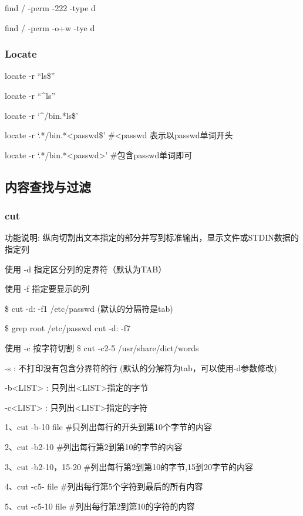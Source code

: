 \documentclass[letterpaper,10pt]{sphinxmanual}
\begin{document}
find / -perm -222 -type d

find / -perm -o+w -tye d


\subsubsection{Locate}
\label{Linux_find/file:locate}
locate -r ``ls\$''

locate -r ``\textasciicircum{}ls''

locate -r `\textasciicircum{}/bin.*ls\$'

locate -r `.*/bin.*\textless{}passwd\$'  \#\textless{}passwd 表示以passwd单词开头

locate -r `.*/bin.*\textless{}passwd\textgreater{}'  \#包含passwd单词即可


\subsection{内容查找与过滤}
\label{Linux_find/content::doc}\label{Linux_find/content:id1}

\subsubsection{cut}
\label{Linux_find/content:cut}
功能说明: 纵向切割出文本指定的部分并写到标准输出，显示文件或STDIN数据的指定列

使用 -d 指定区分列的定界符（默认为TAB）

使用 -f 指定要显示的列

\$ cut -d: -f1 /etc/passwd (默认的分隔符是tab)

\$ grep root /etc/passwd \textbar{} cut -d: -f7

使用 -c 按字符切割
\$ cut -c2-5 /usr/share/dict/words

-s : 不打印没有包含分界符的行 (默认的分解符为tab，可以使用-d参数修改)

-b\textless{}LIST\textgreater{} : 只列出\textless{}LIST\textgreater{}指定的字节

-c\textless{}LIST\textgreater{} : 只列出\textless{}LIST\textgreater{}指定的字符

1、cut -b-10 file \#只列出每行的开头到第10个字节的内容

2、cut -b2-10  \#列出每行第2到第10的字节的内容

3、cut -b2-10，15-20  \#列出每行第2到第10的字节,15到20字节的内容

4、cut -c5- file  \#列出每行第5个字符到最后的所有内容

5、cut -c5-10 file \#列出每行第2到第10的字符的内容
\end{document}

